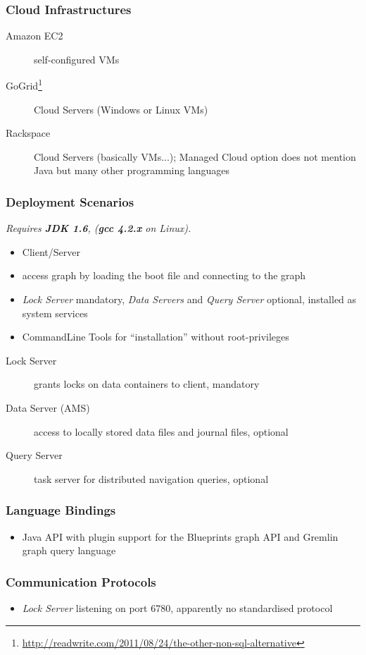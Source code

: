 
\begin{frame}
\frametitle{Cloud Infrastructures}
\begin{description}
	\item[Amazon EC2]
		self-configured VMs
	\item[GoGrid\footnote{\url{http://readwrite.com/2011/08/24/the-other-non-sql-alternative}}]
		Cloud Servers (Windows or Linux VMs)
	\item[Rackspace]
		Cloud Servers (basically VMs...);
		Managed Cloud option does not mention Java but many other programming languages
\end{description}
\end{frame}

\begin{frame}
\frametitle{Deployment Scenarios}
\emph{Requires \textbf{JDK 1.6}, (\textbf{gcc 4.2.x} on Linux).}

\begin{itemize}
	\item Client/Server
	\item access graph by loading the boot file and connecting to the graph
	\item
		\emph{Lock Server} mandatory,
		\emph{Data Servers} and \emph{Query Server} optional,
		installed as system services

	\item CommandLine Tools for ``installation'' without root-privileges
\end{itemize}

\begin{description}
	\item[Lock Server] grants locks on data containers to client,
	mandatory
	\item[Data Server (AMS)] access to locally stored data files and journal files,
	optional
	\item[Query Server] task server for distributed navigation queries,
	optional
\end{description}
\end{frame}

\begin{frame}
\frametitle{Language Bindings}
\begin{itemize}
	\item Java API with plugin support for the Blueprints graph API and Gremlin graph query language
\end{itemize}
\end{frame}

\begin{frame}
\frametitle{Communication Protocols}
\begin{itemize}
	\item \emph{Lock Server} listening on port 6780, apparently no standardised protocol
\end{itemize}
\end{frame}


